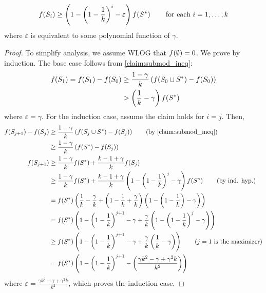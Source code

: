 \begin{claim}
    \begin{equation*}
        f \! \left( S_i \right) \geq \left( 1 - \left( 1 - \frac{1}{k} \right)^i - \varepsilon \right)f \! \left( S^{\ast} \right) \quad \quad 
        \textnormal{for each } i = 1, \ldots, k 
    \end{equation*}
    where $\varepsilon$ is equivalent to some polynomial function of $\gamma$. 
    \label{claim:submod_ineq_induction}
\end{claim}
\begin{proof}
    To simplify analysis, we assume WLOG that $f \! \left( \emptyset \right) = 0$. We prove by induction. 
    The base case follows from \cref{claim:submod_ineq}:
    \begin{align*}
        f \! \left( S_1 \right) = f \! \left( S_1 \right) - f \! \left( S_0 \right) &\geq \frac{1 - \gamma}{k} \left( f \! \left( S_0 \cup  S^{\ast} \right) - f \! \left( S_0 \right) \right) \\
        &> \left( \frac{1}{k} - \gamma \right) f \! \left( S^{\ast} \right)
    \end{align*}
    where $\varepsilon = \gamma$. For the induction case, assume the claim holds for $i = j$. Then, 
    \begin{align*}
        \f{S_{j+1}} - \f{S_j} &\geq \frac{1-\gamma}{k} \lrp{\f{S_j \cup  S^{\ast}} - \f{S_j}}
        \tag*{(by \cref{claim:submod_ineq})}\\
        &\geq \frac{1-\gamma}{k} \lrp{\f{S^{\ast}} - \f{S_j}}\\
        \f{S_{j+1}} &\geq \frac{1-\gamma}{k} \f{S^{\ast}} + \frac{k - 1 + \gamma}{k} \f{S_j}\\
        &\geq \frac{1-\gamma}{k} \f{S^{\ast}} + \frac{k-1+\gamma}{k}\lrp{1 - \lrp{1 - \frac{1}{k}}^j - \gamma} \f{S^{\ast}}
        \tag*{(by ind. hyp.)}\\ 
        &= \f{S^{\ast}} \lrp{\frac{1}{k} - \frac{\gamma}{k} + \lrp{1 - \frac{1}{k} + \frac{\gamma}{k}} \lrp{1 - \lrp{1 - \frac{1}{k}} - \gamma}} \\
        &= \f{S^{\ast}} \lrp{1 - \lrp{1 - \frac{1}{k}}^{j+1} -\gamma + \frac{\gamma}{k} \lrp{1 - \lrp{1 - \frac{1}{k}}^j - \gamma}} 
        \\
        &\geq \f{S^{\ast}} \lrp{1 - \lrp{1 - \frac{1}{k}}^{j+1} -\gamma + \frac{\gamma}{k} \lrp{\frac{1}{k} - \gamma}} 
        \tag*{($j = 1$ is the maximizer)}\\
        &= \f{S^{\ast}} \lrp{1 - \lrp{1 - \frac{1}{k}}^{j+1} - \lrp{\frac{\gamma k^2 - \gamma + \gamma^2 k}{k^2}}}
    \end{align*} 
    where $\varepsilon = \frac{\gamma k^2 - \gamma + \gamma^2 k}{k^2}$, which proves the induction case. 
\end{proof}

